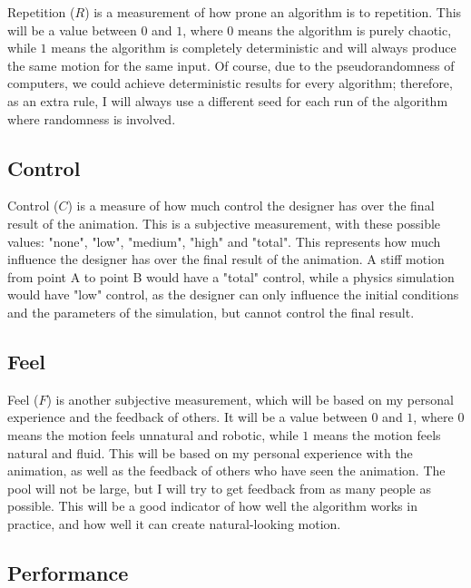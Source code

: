 Repetition (\({R}\)) is a measurement of how prone an algorithm is to repetition. This will be a value between \(0\) and \(1\), where \(0\) means the algorithm is purely chaotic, while \(1\) means the algorithm is completely deterministic and will always produce the same motion for the same input. Of course, due to the pseudorandomness of computers, we could achieve deterministic results for every algorithm; therefore, as an extra rule, I will always use a different seed for each run of the algorithm where randomness is involved.

\subsection{Control}
\label{subsec:control}

Control (\({C}\)) is a measure of how much control the designer has over the final result of the animation. This is a subjective measurement, with these possible values: "none", "low", "medium", "high" and "total". This represents how much influence the designer has over the final result of the animation. A stiff motion from point A to point B would have a "total" control, while a physics simulation would have "low" control, as the designer can only influence the initial conditions and the parameters of the simulation, but cannot control the final result.

\pagebreak

\subsection{Feel}
\label{subsec:feel}

Feel (\(F\)) is another subjective measurement, which will be based on my personal experience and the feedback of others. It will be a value between \(0\) and \(1\), where \(0\) means the motion feels unnatural and robotic, while \(1\) means the motion feels natural and fluid. This will be based on my personal experience with the animation, as well as the feedback of others who have seen the animation. The pool will not be large, but I will try to get feedback from as many people as possible. This will be a good indicator of how well the algorithm works in practice, and how well it can create natural-looking motion.

\subsection{Performance}
\label{subsec:performance}

